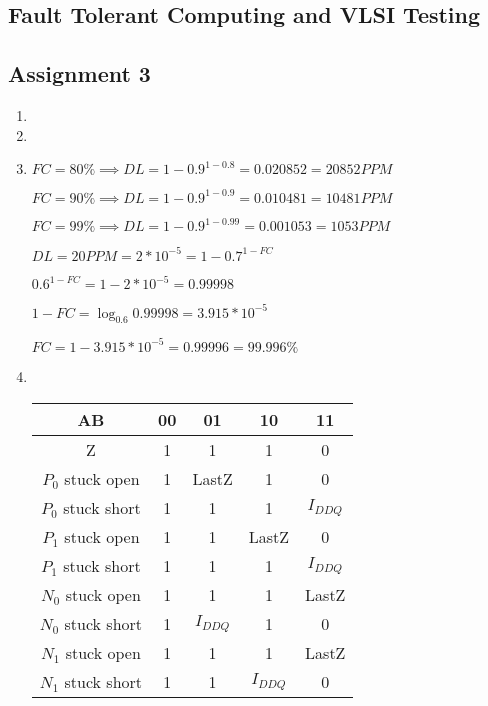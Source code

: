\documentclass[a4paper,12pt]{article}
\begin{document}
    \begin{center}
        \section*{Fault Tolerant Computing and VLSI Testing}
        \subsection*{Assignment 3}
    \end{center}

    \begin{enumerate}

        \item

        \item

        \item $FC = 80\% \implies DL = 1 - 0.9^{1-0.8} = 0.020852 = 20852PPM$

        $FC = 90\% \implies DL = 1 - 0.9^{1-0.9} = 0.010481 = 10481PPM$

        $FC = 99\% \implies DL = 1 - 0.9^{1-0.99} = 0.001053 = 1053PPM$

        $DL = 20PPM = 2 * 10^{-5} = 1 - 0.7^{1 - FC}$

        $0.6^{1 - FC} = 1 - 2 * 10^{-5} = 0.99998$

        $1 - FC = \log_{0.6}0.99998 = 3.915 * 10^{-5}$

        $FC = 1 - 3.915 * 10^{-5} = 0.99996 = 99.996\%$

        \item \mbox{}\\

            \begin{tabular}{|c|c|c|c|c|}
                \hline
                AB                & 00 & 01        & 10        & 11        \\ \hline
                Z                 & 1  & 1         & 1         & 0         \\ \hline
                $P_0$ stuck open  & 1  & LastZ     & 1         & 0         \\ \hline
                $P_0$ stuck short & 1  & 1         & 1         & $I_{DDQ}$ \\ \hline
                $P_1$ stuck open  & 1  & 1         & LastZ     & 0         \\ \hline
                $P_1$ stuck short & 1  & 1         & 1         & $I_{DDQ}$ \\ \hline
                $N_0$ stuck open  & 1  & 1         & 1         & LastZ     \\ \hline
                $N_0$ stuck short & 1  & $I_{DDQ}$ & 1         & 0         \\ \hline
                $N_1$ stuck open  & 1  & 1         & 1         & LastZ     \\ \hline
                $N_1$ stuck short & 1  & 1         & $I_{DDQ}$ & 0         \\ \hline
            \end{tabular}


\end{enumerate}
\end{document}
